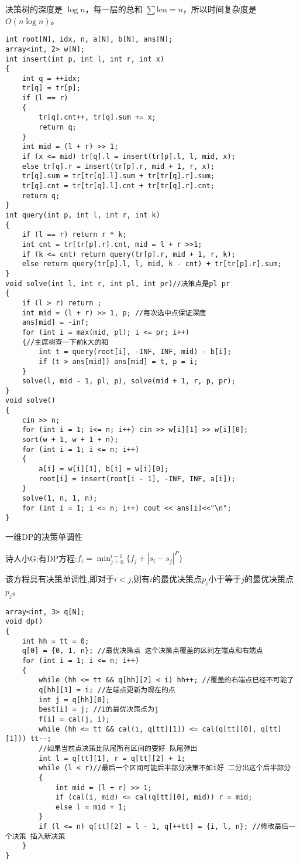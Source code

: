 \documentclass[a4paper, fontset=none]{ctexart}
\begin{document}
决策树的深度是 $\log n$，每一层的总和 $\sum \text{len} = n$，所以时间复杂度是 $O(n\log n)$。

\begin{verbatim}
int root[N], idx, n, a[N], b[N], ans[N];
array<int, 2> w[N];
int insert(int p, int l, int r, int x)
{
    int q = ++idx;
    tr[q] = tr[p];
    if (l == r)
    {
        tr[q].cnt++, tr[q].sum += x;
        return q;
    }
    int mid = (l + r) >> 1;
    if (x <= mid) tr[q].l = insert(tr[p].l, l, mid, x);
    else tr[q].r = insert(tr[p].r, mid + 1, r, x);
    tr[q].sum = tr[tr[q].l].sum + tr[tr[q].r].sum;
    tr[q].cnt = tr[tr[q].l].cnt + tr[tr[q].r].cnt;
    return q;
}
int query(int p, int l, int r, int k)
{
    if (l == r) return r * k;
    int cnt = tr[tr[p].r].cnt, mid = l + r >>1;
    if (k <= cnt) return query(tr[p].r, mid + 1, r, k);
    else return query(tr[p].l, l, mid, k - cnt) + tr[tr[p].r].sum;
}
void solve(int l, int r, int pl, int pr)//决策点是pl pr
{
    if (l > r) return ;
    int mid = (l + r) >> 1, p; //每次选中点保证深度
    ans[mid] = -inf;
    for (int i = max(mid, pl); i <= pr; i++)
    {//主席树查一下前k大的和
        int t = query(root[i], -INF, INF, mid) - b[i];
        if (t > ans[mid]) ans[mid] = t, p = i;
    }
    solve(l, mid - 1, pl, p), solve(mid + 1, r, p, pr);
}
void solve()
{
    cin >> n;
    for (int i = 1; i<= n; i++) cin >> w[i][1] >> w[i][0];
    sort(w + 1, w + 1 + n);
    for (int i = 1; i <= n; i++)
    {
        a[i] = w[i][1], b[i] = w[i][0];
        root[i] = insert(root[i - 1], -INF, INF, a[i]);
    }
    solve(1, n, 1, n);
    for (int i = 1; i <= n; i++) cout << ans[i]<<"\n";
}
\end{verbatim}

一维DP的决策单调性

诗人小G:有DP方程:$f_i=\min_{j=0}^{i-1}\{f_j+|s_i-s_j|^P\}$

该方程具有决策单调性,即对于$i < j$,则有$i$的最优决策点$p_i$小于等于$j$的最优决策点$p_j$。

\begin{verbatim}
array<int, 3> q[N];
void dp()
{
    int hh = tt = 0;
    q[0] = {0, 1, n}; //最优决策点 这个决策点覆盖的区间左端点和右端点
    for (int i = 1; i <= n; i++)
    {
        while (hh <= tt && q[hh][2] < i) hh++; //覆盖的右端点已经不可能了
        q[hh][1] = i; //左端点更新为现在的点
        int j = q[hh][0];
        best[i] = j; //i的最优决策点为j
        f[i] = cal(j, i);
        while (hh <= tt && cal(i, q[tt][1]) <= cal(q[tt][0], q[tt][1])) tt--;
        //如果当前点决策比队尾所有区间的要好 队尾弹出
        int l = q[tt][1], r = q[tt][2] + 1;
        while (l < r)//最后一个区间可能后半部分决策不如i好 二分出这个后半部分
        {
            int mid = (l + r) >> 1;
            if (cal(i, mid) <= cal(q[tt][0], mid)) r = mid;
            else l = mid + 1;
        }
        if (l <= n) q[tt][2] = l - 1, q[++tt] = {i, l, n}; //修改最后一个决策 插入新决策
    }
}
\end{verbatim}
\end{document}

